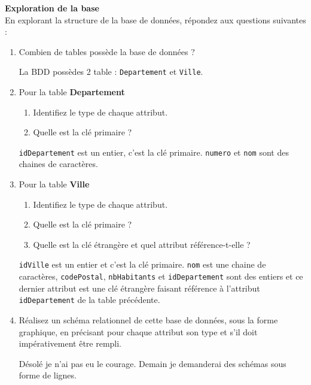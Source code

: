 \documentclass[a4paper,12pt,french]{book}
\begin{document}


\textbf{Exploration de la base}\\	

En explorant la structure de la base de données, répondez aux questions suivantes :

\begin{enumerate}[\bfseries 1.]
	\item 	Combien de tables possède la base de données ? 
            \begin{corrige}
            La BDD possèdes 2 table : \texttt{Departement} et \texttt{Ville}.
            \end{corrige}
	\item 	Pour la table \textbf{Departement}
	\begin{enumerate}[\bfseries a.]
		\item 	Identifiez le type de chaque attribut.
		\item 	Quelle est la clé primaire ?	
	\end{enumerate}	
            \begin{corrige}
            \texttt{idDepartement} est un entier, c'est la clé primaire. \texttt{numero} et \texttt{nom} sont des chaines de caractères.
            \end{corrige}
	\item Pour la table \textbf{Ville}
		\begin{enumerate}[\bfseries a.]
		\item 	Identifiez le type de chaque attribut.
		\item 	Quelle est la clé primaire ?
		\item 	Quelle est la clé étrangère et quel attribut référence-t-elle ?	
	\end{enumerate}	
    \begin{corrige}
    \texttt{idVille} est un entier et c'est la clé primaire. \texttt{nom} est une chaine de caractères, \texttt{codePostal}, \texttt{nbHabitants} et \texttt{idDepartement} sont des entiers et ce dernier attribut est une clé étrangère faisant référence à l'attribut \texttt{idDepartement} de la table précédente.
    \end{corrige}
	\item 	 Réalisez un schéma relationnel de cette base de données, sous la forme graphique, en précisant pour chaque attribut son type et s’il doit impérativement être rempli.
    \begin{corrige}
    Désolé je n'ai pas eu le courage. Demain je demanderai des schémas sous forme de lignes.
    \end{corrige}
\end{enumerate}
\end{document}
